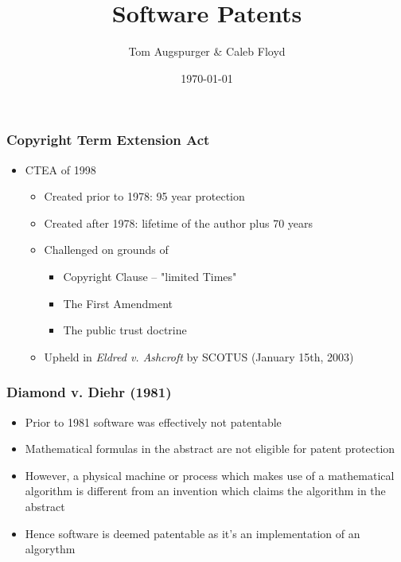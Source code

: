 \documentclass{beamer}
\title{Software Patents}
\author{Tom Augspurger \& Caleb Floyd}
\date{\today}
\begin{document}
\frame{\titlepage}

\begin{frame}
	\frametitle{Copyright Term Extension Act}
  \begin{itemize}
    \item CTEA of 1998
	  \begin{itemize}
		\item Created prior to 1978: 95 year protection
		\item Created after 1978: lifetime of the author plus 70 years
		\item Challenged on grounds of
		\begin{itemize}
			\item Copyright Clause -- "limited Times"
			\item The First Amendment
			\item The public trust doctrine
		\end{itemize}
		\item Upheld in \emph{Eldred v. Ashcroft} by SCOTUS (January 15th, 2003)
	\end{itemize}
  \end{itemize}
\end{frame}

\begin{frame}
 \frametitle{Diamond v. Diehr (1981)}
 \begin{itemize}
	 \item Prior to 1981 software was effectively not patentable 
	 \item Mathematical formulas in the abstract are not eligible for patent protection
	 \item However, a physical machine or process which makes use of a mathematical algorithm is different from an invention which claims the algorithm in the abstract
	 \item Hence software is deemed patentable as it's an implementation of an algorythm
 \end{itemize}
\end{frame}
\end{document}

